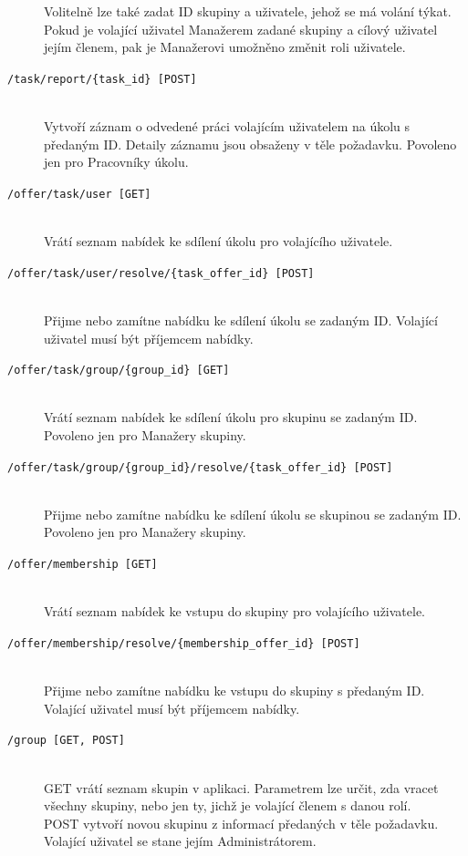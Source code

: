 \documentclass[thesis=B,czech]{FITthesis}[2012/06/26]
\newcommand{\forworkers}{Povoleno jen pro Pracovníky úkolu.}
\newcommand{\formanagers}{Povoleno jen pro Manažery skupiny.}
\begin{document}
\begin{description}
				Volitelně lze také zadat ID skupiny a uživatele, jehož se má volání týkat. Pokud je volající uživatel Manažerem zadané skupiny a cílový uživatel jejím členem, pak je Manažerovi umožněno změnit roli uživatele.
			
			\item[\texttt{/task/report/\{task\_id\} [POST]}] \hfill \\
				Vytvoří záznam o odvedené práci volajícím uživatelem na úkolu s předaným ID. Detaily záznamu jsou obsaženy v těle požadavku. \forworkers
				
			\item[\texttt{/offer/task/user [GET]}] \hfill \\
				Vrátí seznam nabídek ke sdílení úkolu pro volajícího uživatele.
			
			\item[\texttt{/offer/task/user/resolve/\{task\_offer\_id\} [POST]}] \hfill \\
				Přijme nebo zamítne nabídku ke sdílení úkolu se zadaným ID. Volající uživatel musí být příjemcem nabídky.
				
			\item[\texttt{/offer/task/group/\{group\_id\} [GET]}] \hfill \\
				Vrátí seznam nabídek ke sdílení úkolu pro skupinu se zadaným ID. \formanagers
			
			\item[\texttt{/offer/task/group/\{group\_id\}/resolve/\{task\_offer\_id\} [POST]}] \hfill \\
				Přijme nebo zamítne nabídku ke sdílení úkolu se skupinou se zadaným ID. \formanagers
			
			\item[\texttt{/offer/membership [GET]}] \hfill \\
				Vrátí seznam nabídek ke vstupu do skupiny pro volajícího uživatele.
			
			\item[\texttt{/offer/membership/resolve/\{membership\_offer\_id\} [POST]}] \hfill \\
				Přijme nebo zamítne nabídku ke vstupu do skupiny s předaným ID.  Volající uživatel musí být příjemcem nabídky.
			
			\item[\texttt{/group [GET, POST]}] \hfill \\
				GET vrátí seznam skupin v aplikaci. Parametrem lze určit, zda vracet všechny skupiny, nebo jen ty, jichž je volající členem s danou rolí. \\
				POST vytvoří novou skupinu z informací předaných v těle požadavku. Volající uživatel se stane jejím Administrátorem.
			

\end{description}
\end{document}
